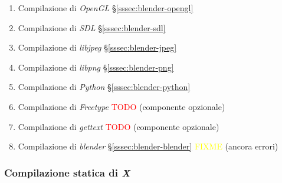 \begin{enumerate}
\item Compilazione di \emph{OpenGL} \S\ref{sssec:blender-opengl}
\item Compilazione di \emph{SDL} \S\ref{sssec:blender-sdl}
\item Compilazione di \emph{libjpeg} \S\ref{sssec:blender-jpeg}
\item Compilazione di \emph{libpng} \S\ref{sssec:blender-png}
\item Compilazione di \emph{Python} \S\ref{sssec:blender-python}
\item Compilazione di \emph{Freetype} {\small\textcolor{red}{TODO} (componente opzionale)}
\item Compilazione di \emph{gettext} {\small\textcolor{red}{TODO} (componente opzionale)}
\item Compilazione di \emph{blender} \S\ref{sssec:blender-blender} {\small\textcolor{yellow}{FIXME} (ancora errori)}
\end{enumerate}

\subsubsection{Compilazione statica di \emph{X}} \label{sssec:blender-x}

